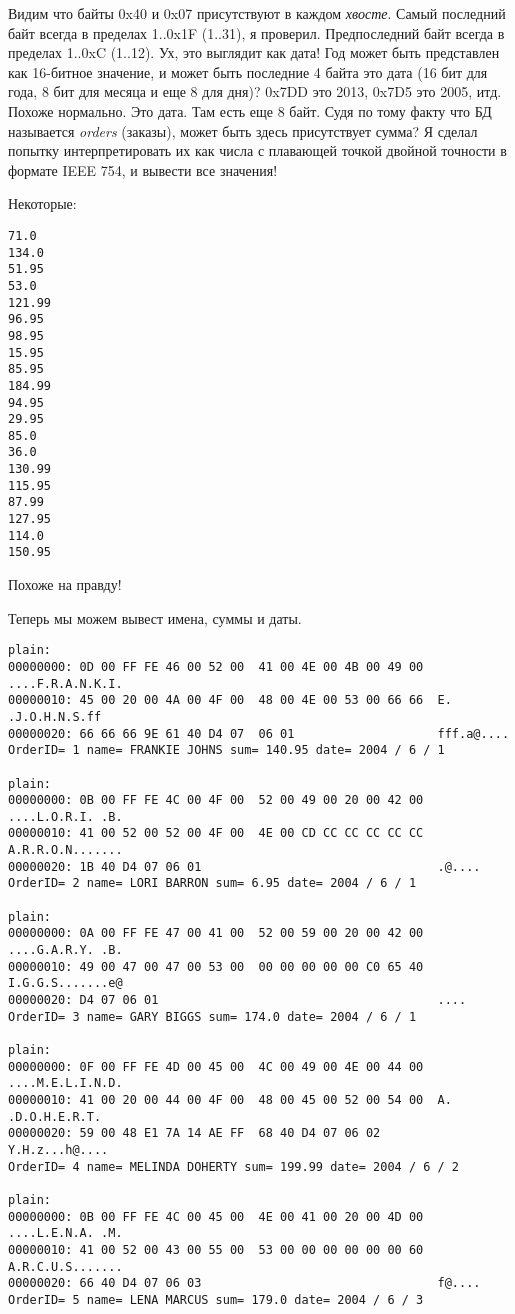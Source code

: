 

Видим что байты 0x40 и 0x07 присутствуют в каждом \emph{хвосте}.
Самый последний байт всегда в пределах 1..0x1F (1..31), я проверил.
Предпоследний байт всегда в пределах 1..0xC (1..12).
Ух, это выглядит как дата!
Год может быть представлен как 16-битное значение, и может быть последние 4 байта это дата (16 бит для года, 8 бит для
месяца и еще 8 для дня)?
0x7DD это 2013, 0x7D5 это 2005, итд. Похоже нормально. Это дата.
Там есть еще 8 байт.
Судя по тому факту что БД называется \emph{orders} (заказы), может быть здесь присутствует сумма?
Я сделал попытку интерпретировать их как числа с плавающей точкой двойной точности в формате IEEE 754, и вывести все значения!

Некоторые:

\begin{lstlisting}
71.0
134.0
51.95
53.0
121.99
96.95
98.95
15.95
85.95
184.99
94.95
29.95
85.0
36.0
130.99
115.95
87.99
127.95
114.0
150.95
\end{lstlisting}

Похоже на правду!

Теперь мы можем вывест имена, суммы и даты.

\begin{lstlisting}
plain:
00000000: 0D 00 FF FE 46 00 52 00  41 00 4E 00 4B 00 49 00  ....F.R.A.N.K.I.
00000010: 45 00 20 00 4A 00 4F 00  48 00 4E 00 53 00 66 66  E. .J.O.H.N.S.ff
00000020: 66 66 66 9E 61 40 D4 07  06 01                    fff.a@....
OrderID= 1 name= FRANKIE JOHNS sum= 140.95 date= 2004 / 6 / 1

plain:
00000000: 0B 00 FF FE 4C 00 4F 00  52 00 49 00 20 00 42 00  ....L.O.R.I. .B.
00000010: 41 00 52 00 52 00 4F 00  4E 00 CD CC CC CC CC CC  A.R.R.O.N.......
00000020: 1B 40 D4 07 06 01                                 .@....
OrderID= 2 name= LORI BARRON sum= 6.95 date= 2004 / 6 / 1

plain:
00000000: 0A 00 FF FE 47 00 41 00  52 00 59 00 20 00 42 00  ....G.A.R.Y. .B.
00000010: 49 00 47 00 47 00 53 00  00 00 00 00 00 C0 65 40  I.G.G.S.......e@
00000020: D4 07 06 01                                       ....
OrderID= 3 name= GARY BIGGS sum= 174.0 date= 2004 / 6 / 1

plain:
00000000: 0F 00 FF FE 4D 00 45 00  4C 00 49 00 4E 00 44 00  ....M.E.L.I.N.D.
00000010: 41 00 20 00 44 00 4F 00  48 00 45 00 52 00 54 00  A. .D.O.H.E.R.T.
00000020: 59 00 48 E1 7A 14 AE FF  68 40 D4 07 06 02        Y.H.z...h@....
OrderID= 4 name= MELINDA DOHERTY sum= 199.99 date= 2004 / 6 / 2

plain:
00000000: 0B 00 FF FE 4C 00 45 00  4E 00 41 00 20 00 4D 00  ....L.E.N.A. .M.
00000010: 41 00 52 00 43 00 55 00  53 00 00 00 00 00 00 60  A.R.C.U.S.......
00000020: 66 40 D4 07 06 03                                 f@....
OrderID= 5 name= LENA MARCUS sum= 179.0 date= 2004 / 6 / 3
\end{lstlisting}

